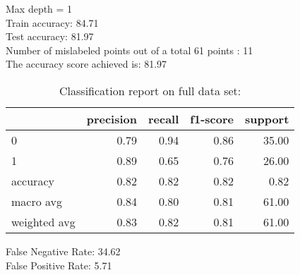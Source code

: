 Max depth = 1\\
Train accuracy: 84.71%
\\Test accuracy: 81.97%
\\Number of mislabeled points out of a total 61 points : 11
\\The accuracy score achieved is: 81.97 %
\begin{table}[H]
\caption{Classification report on full data set:}
\begin{center}
\begin{tabular}{lrrrr}
\toprule
{} &  precision &  recall &  f1-score &  support \\
\midrule
0            &       0.79 &    0.94 &      0.86 &    35.00 \\
1            &       0.89 &    0.65 &      0.76 &    26.00 \\
accuracy     &       0.82 &    0.82 &      0.82 &     0.82 \\
macro avg    &       0.84 &    0.80 &      0.81 &    61.00 \\
weighted avg &       0.83 &    0.82 &      0.81 &    61.00 \\
\bottomrule
\end{tabular}

\label{random_forest_class}
\end{center}
\end{table}
\noindent
False Negative Rate: 34.62
\\False Positive Rate: 5.71
